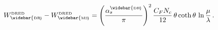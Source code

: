 \begin{equation}
W^{\mbox{\tiny DRED}}_{{\rm \widebar{\scriptscriptstyle DR\!}}}
-
W^{\mbox{\tiny DRED}}_{{\rm \widebar{\scriptscriptstyle MS\!}}}
=
\left(
\frac{
\alpha_s^{{\rm \widebar{\scriptscriptstyle DR\!}}}
}{
\pi
}
\right)^2
\frac{C_F N_c}{12} \, \theta \coth \theta \, \ln \frac{\mu}{\lambda}
\, .
\label{diff-W}
\end{equation}


